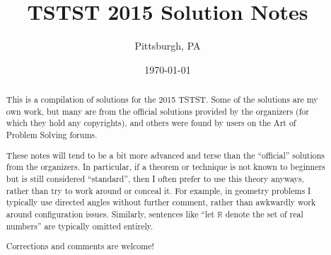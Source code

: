 \documentclass[11pt]{scrartcl}
\begin{document}
\title{TSTST 2015 Solution Notes}
\subtitle{Pittsburgh, PA}
\date{\today}

\maketitle
\begin{abstract}
This is a compilation of solutions
for the 2015 TSTST.
Some of the solutions are my own work,
but many are from the official solutions provided by the organizers
(for which they hold any copyrights),
and others were found by users on the Art of Problem Solving forums.

These notes will tend to be a bit more advanced and terse than the ``official''
solutions from the organizers.
In particular, if a theorem or technique is not known to beginners
but is still considered ``standard'', then I often prefer to
use this theory anyways, rather than try to work around or conceal it.
For example, in geometry problems I typically use directed angles
without further comment, rather than awkwardly work around configuration issues.
Similarly, sentences like ``let $\mathbb{R}$ denote the set of real numbers''
are typically omitted entirely.

Corrections and comments are welcome!
\end{abstract}
\tableofcontents
\newpage

\addtocounter{section}{-1}
\end{document}
